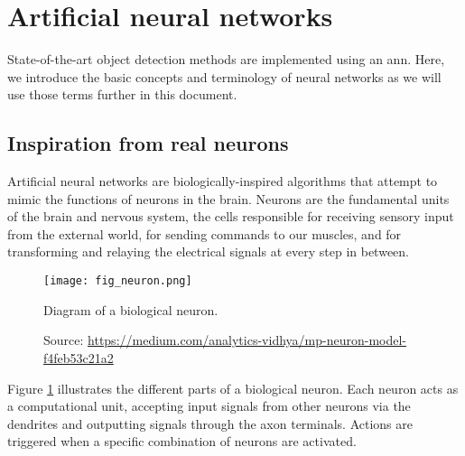 \section{Artificial neural networks}
State-of-the-art object detection methods are implemented using an \acrfull{ann}. Here, we introduce the basic concepts and terminology of neural networks as we will use those terms further in this document. 

\subsection{Inspiration from real neurons}
Artificial neural networks are biologically-inspired algorithms that attempt to mimic the functions of neurons in the brain. Neurons are the fundamental units of the brain and nervous system, the cells responsible for receiving sensory input from the external world, for sending commands to our muscles, and for transforming and relaying the electrical signals at every step in between.
\begin{figure}[ht]
    \texttt{[image: fig\_neuron.png]}
    \caption[Diagram of a biological neuron]{Diagram of a biological neuron.}
    \caption*{Source: \href{ https://medium.com/analytics-vidhya/mp-neuron-model-f4feb53c21a2}{https://medium.com/analytics-vidhya/mp-neuron-model-f4feb53c21a2}}
    \label{fig:neuron}
\end{figure}
Figure \ref{fig:neuron} illustrates the different parts of a biological neuron.
Each neuron acts as a computational unit, accepting input signals from other neurons via the dendrites and outputting signals through the axon terminals. Actions are triggered when a specific combination of neurons are activated.

